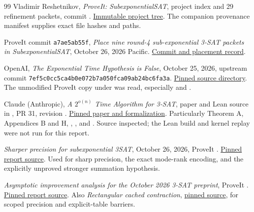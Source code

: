 \begin{thebibliography}{99}
Vladimir Reshetnikov, \emph{ProveIt: SubexponentialSAT}, project index and
29 refinement packets, commit \pin.
\href{https://github.com/VladimirReshetnikov/ProveIt/tree/a7ae5ab55f9627f5af7bf77443b3c34ef8ef1be4/Computability/SubexponentialSAT}{Immutable project tree}.
The companion provenance manifest supplies exact file hashes and paths.

ProveIt commit \texttt{a7ae5ab55f}, \emph{Place nine round-4
sub-exponential 3-SAT packets in SubexponentialSAT}, October 26, 2026 Pacific.
\href{https://github.com/VladimirReshetnikov/ProveIt/commit/a7ae5ab55f9627f5af7bf77443b3c34ef8ef1be4}{Commit and placement record}.

OpenAI, \emph{The Exponential Time Hypothesis is False}, October 25, 2026,
upstream commit \texttt{7ef5c0cc5ca4b0e072b7a050fca09ab24bc6fa3a}.
\href{https://github.com/openai/math/tree/7ef5c0cc5ca4b0e072b7a050fca09ab24bc6fa3a/preprints/The-Exponential-Time-Hypothesis-is-False-October-25-2026}{Pinned source directory}.
The unmodified ProveIt copy under 
was read, especially  and
.

Claude (Anthropic), \emph{A $2^{o(n)}$ Time Algorithm for 3-SAT}, paper
and Lean source in , PR 31, revision \ap.
\href{https://github.com/anthropics/formal-math/tree/1a6eee293b9e00cb432eef6018a21f523623a9af/eth}{Pinned paper and formalization}.
Particularly Theorem A, Appendices B and H, ,
, and . Source inspected;
the Lean build and kernel replay were not run for this report.

\emph{Sharper precision for subexponential 3SAT}, October 26, 2026,
ProveIt .
\href{\baseurl 3sat_precision_refinement/report.tex}{Pinned report source}.
Used for sharp precision, the exact mode-rank encoding, and the explicitly
unproved stronger summation hypothesis.

\emph{Asymptotic improvement analysis for the October 2026 3-SAT preprint},
ProveIt .
\href{\baseurl 3sat_asymptotic_analysis/report/report.tex}{Pinned report source}.
Also \emph{Rectangular cached contraction},
\href{\baseurl subsat_rectangular/report.tex}{pinned source}, for scoped
precision and explicit-table barriers.


\end{thebibliography}
